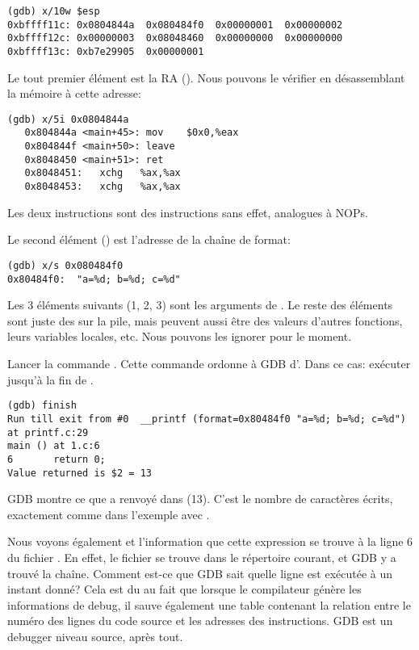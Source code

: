 \begin{lstlisting}
(gdb) x/10w $esp
0xbffff11c:	0x0804844a	0x080484f0	0x00000001	0x00000002
0xbffff12c:	0x00000003	0x08048460	0x00000000	0x00000000
0xbffff13c:	0xb7e29905	0x00000001
\end{lstlisting}

Le tout premier élément est la \ac{RA} ().
Nous pouvons le vérifier en désassemblant la mémoire à cette adresse:

\begin{lstlisting}[label=NOP_as_XCHG_example,style=customasmx86]
(gdb) x/5i 0x0804844a
   0x804844a <main+45>:	mov    $0x0,%eax
   0x804844f <main+50>:	leave  
   0x8048450 <main+51>:	ret    
   0x8048451:	xchg   %ax,%ax
   0x8048453:	xchg   %ax,%ax
\end{lstlisting}

Les deux instructions  sont des instructions sans effet, analogues à \ac{NOP}s.

Le second élément () est l'adresse de la chaîne de format:

\begin{lstlisting}
(gdb) x/s 0x080484f0
0x80484f0:	"a=%d; b=%d; c=%d"
\end{lstlisting}

Les 3 éléments suivants (1, 2, 3) sont les arguments de \printf.
Le reste des éléments sont juste des  sur la pile, mais peuvent aussi
être des valeurs d'autres fonctions, leurs variables locales, etc.
Nous pouvons les ignorer pour le moment.

Lancer la commande .
Cette commande ordonne à GDB d'.
Dans ce cas: exécuter jusqu'à la fin de \printf.

\begin{lstlisting}
(gdb) finish
Run till exit from #0  __printf (format=0x80484f0 "a=%d; b=%d; c=%d") at printf.c:29
main () at 1.c:6
6		return 0;
Value returned is $2 = 13
\end{lstlisting}

\ac{GDB} montre ce que \printf a renvoyé dans \EAX (13).
C'est le nombre de caractères écrits, exactement comme dans l'exemple avec \olly.

Nous voyons également  et l'information que cette expression se trouve
à la ligne 6 du fichier .
En effet, le fichier  se trouve dans le répertoire courant, et \ac{GDB}
y a trouvé la chaîne.
Comment est-ce que \ac{GDB} sait quelle ligne est exécutée à un instant donné?
Cela est du au fait que lorsque le compilateur génère les informations de debug,
il sauve également une table contenant la relation entre le numéro des lignes du
code source et les adresses des instructions.
GDB est un debugger niveau source, après tout.

